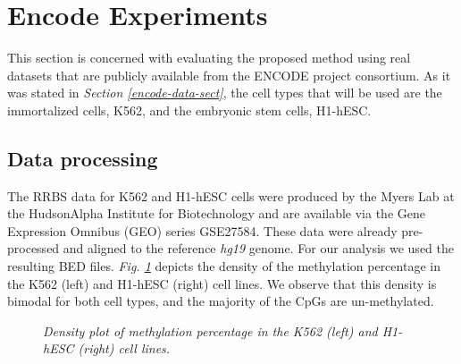 \section{Encode Experiments} \label{meth-encode-experiments-sect}
This section is concerned with evaluating the proposed method using real datasets that are publicly available from the ENCODE project consortium. As it was stated in \emph{Section \ref{encode-data-sect}}, the cell types that will be used are the immortalized cells, K562, and the embryonic stem cells, H1-hESC. 

\subsection{Data processing}
The RRBS data for K562 and H1-hESC cells were produced by the Myers Lab at the HudsonAlpha Institute for Biotechnology and are available via the Gene Expression Omnibus (GEO) series GSE27584. These data were already pre-processed and aligned to the reference \emph{hg19} genome. For our analysis we used the resulting BED files. \emph{Fig. \ref{meth-dens-pic}} depicts the density of the methylation percentage in the K562 (left) and H1-hESC (right) cell lines. We observe that this density is bimodal for both cell types, and the majority of the CpGs are un-methylated. 

\begin{figure}[ht!]
     \begin{center}
    \end{center}
    \caption{\emph{Density plot of methylation percentage in the K562 (left) and H1-hESC (right) cell lines.}}
   \label{meth-dens-pic}
\end{figure}

